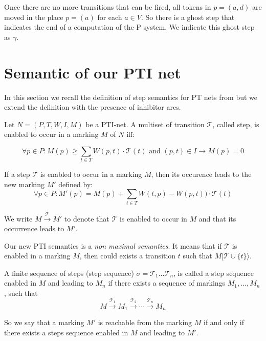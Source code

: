 Once there are no more transitions that can be fired, all tokens in $p=(a,d)$ are moved in the place $p=(a)$ for each $a \in V$. So there is a ghost step that indicates the end of a computation of the P system. 
We indicate this ghost step as $\gamma$.

\section{Semantic of our PTI net}

In this section we recall the definition of step semantics for PT nets from \cite{vogler1992partial} but we extend the definition with the presence of inhibitor arcs.

\begin{definition}[Step]
    Let $N=(P,T,W,I,M)$ be a PTI-net.
    A multiset of transition $\mathcal{T}$, called step, is enabled to occur in a marking 
    $M$ of $N$ iff:
    
    \[ \forall p \in P : M(p) \geq \sum_{t \in T} W(p,t) \cdot \mathcal{T}(t)  \text{ and }
    (p,t) \in I \rightarrow M(p)=0 \]

    If a step $\mathcal{T}$ is enabled to occur in a marking $M$, then its occurence leads to the new marking $M'$ defined by:
    \[ \forall p \in P : M'(p)=M(p)+\sum_{t \in T} W(t,p) - W(p,t)) \cdot \mathcal{T}(t) \]

    We write $M \xrightarrow{\mathcal{T}} M'$ to denote that $\mathcal{T}$ is enabled to occur in 
    $M$ and that its occurrence leads to $M'$.
\end{definition}

Our new PTI semantics is a \textit{non maximal semantics}.
It means that if $\mathcal{T}$ is enabled in a marking $M$, then could exists a transition $t$ such that $M[\mathcal{T} \cup \{t\}\rangle$.

\begin{definition}
    A finite sequence of steps (step sequence) $\sigma = \mathcal{T}_1 \dots \mathcal{T}_n$, is called a step sequence enabled in $M$ and leading to $M_n$ if there exists a sequence of markings $M_1, \ldots , M_n$, such that
    \[ M \xrightarrow{\mathcal{T}_1} M_1 \xrightarrow{\mathcal{T}_2} \cdots \xrightarrow{\mathcal{T}_n} M_n\]

    So we say that a marking $M'$ is reachable from the marking $M$ if and only if there exists a steps sequence enabled in $M$ and leading to $M'$.
\end{definition}